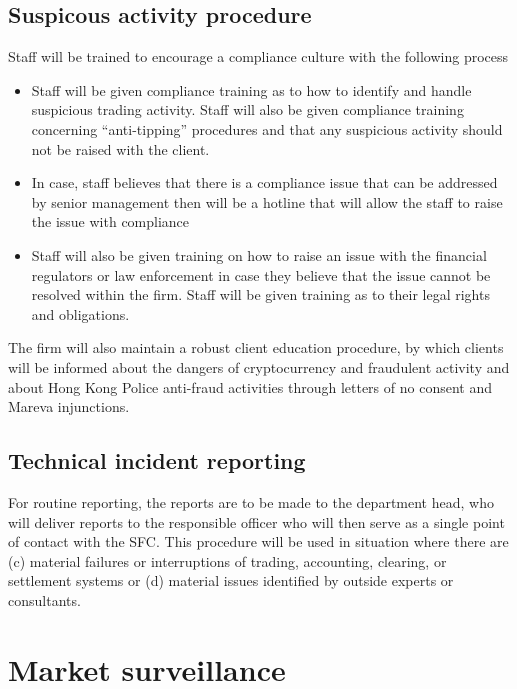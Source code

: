 \subsection{Suspicous activity procedure}

Staff will be trained to encourage a compliance culture with the
following process
\begin{itemize}
  \item Staff will be given compliance training as to how to identify
    and handle suspicious trading activity.  Staff will also be given
    compliance training concerning ``anti-tipping'' procedures and
    that any suspicious activity should not be raised with the client.
  \item In case, staff believes that there is a compliance issue that
    can be addressed by senior management then will be a hotline that
    will allow the staff to raise the issue with compliance
  \item Staff will also be given training on how to raise an issue
    with the financial regulators or law enforcement in case they
    believe that the issue cannot be resolved within the firm.  Staff
    will be given training as to their legal rights and obligations.
\end{itemize}

The firm will also maintain a robust client education procedure, by
which clients will be informed about the dangers of cryptocurrency and
fraudulent activity and about Hong Kong Police anti-fraud activities
through letters of no consent and Mareva injunctions.

\subsection{Technical incident reporting}

For routine reporting, the reports are to be made to the department
head, who will deliver reports to the responsible officer who will
then serve as a single point of contact with the SFC.  This procedure
will be used in situation where there are (c) material failures or
interruptions of trading, accounting, clearing, or settlement systems
or (d) material issues identified by outside experts or consultants.


\section{Market surveillance}

